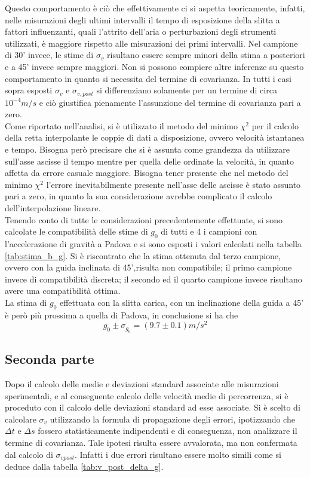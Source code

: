 \documentclass[a4paper,11pt,oneside]{article}
\begin{document}
Questo comportamento è ciò che effettivamente ci si aspetta teoricamente, infatti, nelle misurazioni degli ultimi intervalli il tempo di esposizione della slitta a fattori influenzanti, quali l'attrito dell'aria o perturbazioni degli strumenti utilizzati, è maggiore rispetto alle misurazioni dei primi intervalli. Nel campione di 30' invece, le stime di $\sigma_{v}$ risultano essere sempre minori della stima a posteriori e a 45' invece sempre maggiori. Non si possono compiere altre inferenze su questo comportamento in quanto si necessita del termine di covarianza. In tutti i casi sopra esposti $\sigma_{v}$ e $\sigma_{v, post}$ si differenziano solamente per un termine di circa $10^{-4}\si{m/s}$ e ciò giustifica pienamente l'assunzione del termine di covarianza pari a zero.\\
Come riportato nell'analisi, si è utilizzato il metodo del minimo  ${\chi}^2$ per il calcolo della retta interpolante le coppie di dati a disposizione, ovvero velocità istantanea e tempo. Bisogna però precisare che si è assunta come grandezza da utilizzare sull'asse ascisse il tempo mentre per quella delle ordinate la velocità, in quanto affetta da errore casuale maggiore. Bisogna tener presente che nel metodo del minimo ${\chi}^{2}$ l'errore inevitabilmente presente nell'asse delle ascisse è stato assunto pari a zero, in quanto la sua considerazione avrebbe complicato il calcolo dell'interpolazione lineare. \\
Tenendo conto di tutte le considerazioni precedentemente effettuate, si sono calcolate le compatibilità delle stime di $g_0$ di tutti e 4 i campioni con l'accelerazione di gravità a Padova e si sono esposti i valori calcolati nella tabella \ref{tab:stima_b_g}. Si è riscontrato che la stima ottenuta dal terzo campione, ovvero con la guida inclinata di 45',risulta non compatibile; il primo campione invece di compatibilità discreta; il secondo ed il quarto campione invece risultano avere una compatibilità ottima.\\
La stima di $g_0$ effettuata con la slitta carica, con un inclinazione della guida a 45' è però più prossima a quella di Padova, in conclusione si ha che
\begin{equation*}
    g_0\pm\sigma_{g_0}=\left ( 9.7 \pm 0.1 \right ) m/s^{2}
\end{equation*}

\subsection{Seconda parte}
Dopo il calcolo delle medie e deviazioni standard associate alle misurazioni sperimentali, e al conseguente calcolo delle velocità medie di percorrenza, si è proceduto con il calcolo delle deviazioni standard ad esse associate. Si è scelto di calcolare $\sigma_{v}$ utilizzando la formula di propagazione degli errori, ipotizzando che $\Delta t$ e $\Delta s$ fossero statisticamente  indipendenti e di conseguenza, non analizzare il termine di covarianza. Tale ipotesi risulta essere avvalorata, ma non confermata dal calcolo di $\sigma_{v post}$. Infatti i due errori risultano essere molto simili come si deduce dalla tabella \ref{tab:v_post_delta_g}.
\end{document}
